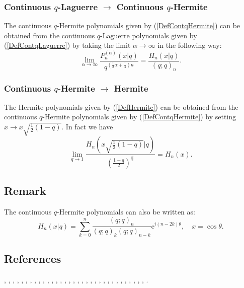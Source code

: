 \documentclass[envcountchap,graybox]{svmono}
\newcounter{rom}
\newcommand{\e}{\textrm{e}}
\begin{document}
\subsubsection*{Continuous $q$-Laguerre $\rightarrow$ Continuous $q$-Hermite}
The continuous $q$-Hermite polynomials given by (\ref{DefContqHermite}) can
be obtained from the continuous $q$-Laguerre polynomials given by
(\ref{DefContqLaguerre}) by taking the limit $\alpha\rightarrow\infty$ in the
following way:
$$\lim_{\alpha\rightarrow\infty}
\frac{P_n^{(\alpha)}(x|q)}{q^{(\frac{1}{2}\alpha+\frac{1}{4})n}}
=\frac{H_n(x|q)}{(q;q)_n}.$$

\subsubsection*{Continuous $q$-Hermite $\rightarrow$ Hermite}
The Hermite polynomials given by (\ref{DefHermite}) can be obtained
from the continuous $q$-Hermite polynomials given by (\ref{DefContqHermite}) by
setting $x\rightarrow x\sqrt{\frac{1}{2}(1-q)}$. In fact we have
\begin{equation}
\lim_{q\rightarrow 1}
\frac{H_n(x\sqrt{\frac{1}{2}(1-q)}|q)}
{\left(\frac{1-q}{2}\right)^{\frac{n}{2}}}=H_n(x).
\end{equation}

\subsection*{Remark} The continuous $q$-Hermite polynomials can also be written
as:
$$H_n(x|q)=\sum_{k=0}^n\frac{(q;q)_n}{(q;q)_k(q;q)_{n-k}}\e^{i(n-2k)\theta},
\quad x=\cos\theta.$$

\subsection*{References}
\cite{Allaway80}, \cite{AlSalam90}, \cite{AlSalam95}, \cite{AlSalamIsmail88},
\cite{AndrewsAskey85}, \cite{Askey89I}, \cite{Askey89II}, \cite{AskeyIsmail80},
\cite{AskeyIsmail83}, \cite{AskeyWilson85}, \cite{AskeyRahmanSuslov}, \cite{AtakKlimyk2007},
\cite{Atak96}, \cite{AtakFeinsilver}, \cite{AtakRahmanSuslov}, \cite{AtakAtakIII},
\cite{AtakAtakIV}, \cite{BergIsmail}, \cite{Bressoud80}, \cite{BustozIsmail82},
\cite{BustozIsmail97}, \cite{FloreaniniVinetI}, \cite{GasperRahman83II}, \cite{GasperRahman90},
\cite{Ismail86II}, \cite{Ismail2005I}, \cite{IsmailMasson94}, \cite{IsmailStanton88},
\cite{IsmailStantonViennot}, \cite{Nikiforov+}, \cite{Rogers93}, \cite{Rogers94},
\cite{Rogers95}, \cite{SrivastavaJain89}.
\end{document}
